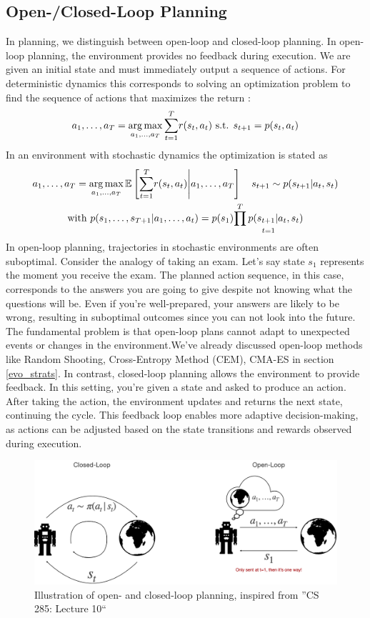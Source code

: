 \subsection{Open-/Closed-Loop Planning}
In planning, we distinguish between open-loop and closed-loop planning.
In open-loop planning, the environment provides no feedback during execution. We are given 
an initial state and must immediately output a sequence of actions. For deterministic dynamics
this corresponds to solving an optimization problem to find the sequence of actions that maximizes the 
return :
$$a_1,\dots,a_T = \operatorname*{arg\,max}\limits_{a_1,\dots,a_T} \underset{t=1}{\sum^T}r(s_t,a_t)\text{ s.t. } s_{t+1} = p(s_t,a_t)$$
In an environment with stochastic dynamics the optimization is stated as 
\begin{gather*}
    a_1,\dots,a_T = \operatorname*{arg\,max}\limits_{a_1,\dots,a_T} \mathbb{E}\left[\underset{t=1}{\sum^T}r(s_t,a_t) \middle| a_1,\dots,a_T \right] 
    \quad s_{t+1} \sim p(s_{t+1}|a_t,s_t) \\
    \text{with } p(s_1,\dots,s_{T+1}|a_1,\dots,a_t) = p(s_1) \underset{t=1}{\prod^T p(s_{t+1}|a_t,s_t)} 
\end{gather*}
In open-loop planning, trajectories in stochastic environments are often suboptimal. Consider the analogy of taking an exam. Let’s say state 
$s_1$ represents the moment you receive the exam. The planned action sequence, in this case, corresponds to the answers you are going to give 
despite not knowing what the questions will be. Even if you're well-prepared, your answers are likely to be wrong, resulting in suboptimal 
outcomes since you can not look into the future. The fundamental problem is that open-loop plans cannot adapt to unexpected events or changes 
in the environment.We've already discussed open-loop methods like Random Shooting, Cross-Entropy Method (CEM), CMA-ES in section 
\ref{evo_strats}.\newline
In contrast, closed-loop planning allows the environment to provide feedback. In this 
setting, you’re given a state and asked to produce an action. After taking the action, the 
environment updates and returns the next state, continuing the cycle. This feedback loop 
enables more adaptive decision-making, as actions can be adjusted based on the state 
transitions and rewards observed during execution.
\begin{figure}[H]
    \centering
    \includegraphics[width=0.9\linewidth]{images/closed_open_loop.png}
    \caption{Illustration of open- and closed-loop planning, inspired from ''CS 285: Lecture 10`` \cite{CS285,CS285LevineYoutube}}
    \label{fig:open_closed_loop}
\end{figure}

